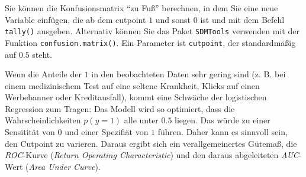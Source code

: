 \documentclass[12pt,]{book}
\newenvironment{Shaded}{\begin{snugshade}}{\end{snugshade}}
\newcommand{\KeywordTok}[1]{\textcolor[rgb]{0.13,0.29,0.53}{\textbf{{#1}}}}
\newcommand{\DataTypeTok}[1]{\textcolor[rgb]{0.13,0.29,0.53}{{#1}}}
\newcommand{\DecValTok}[1]{\textcolor[rgb]{0.00,0.00,0.81}{{#1}}}
\newcommand{\FloatTok}[1]{\textcolor[rgb]{0.00,0.00,0.81}{{#1}}}
\newcommand{\StringTok}[1]{\textcolor[rgb]{0.31,0.60,0.02}{{#1}}}
\newcommand{\CommentTok}[1]{\textcolor[rgb]{0.56,0.35,0.01}{\textit{{#1}}}}
\newcommand{\NormalTok}[1]{{#1}}
\begin{document}
Sie können die Konfusionsmatrix ``zu Fuß'' berechnen, in dem Sie eine
neue Variable einfügen, die ab dem cutpoint \(1\) und sonst \(0\) ist
und mit dem Befehl \texttt{tally()} ausgeben. Alternativ können Sie das
Paket \texttt{SDMTools} verwenden mit der Funktion
\texttt{confusion.matrix()}. Ein Parameter ist \texttt{cutpoint}, der
standardmäßig auf \(0.5\) steht.

\begin{Shaded}
\end{Shaded}

Wenn die Anteile der \(1\) in den beobachteten Daten sehr gering sind
(z. B. bei einem medizinischem Test auf eine seltene Krankheit, Klicks
auf einen Werbebanner oder Kreditausfall), kommt eine Schwäche der
logistischen Regression zum Tragen: Das Modell wird so optimiert, dass
die Wahrscheinlichkeiten \(p(y=1)\) alle unter \(0.5\) liegen. Das würde
zu einer Sensitität von \(0\) und einer Spezifiät von \(1\) führen.
Daher kann es sinnvoll sein, den Cutpoint zu varieren. Daraus ergibt
sich ein verallgemeinertes Gütemaß, die \emph{ROC}-Kurve (\emph{Return
Operating Characteristic}) und den daraus abgeleiteten \emph{AUC}-Wert
(\emph{Area Under Curve}).
\end{document}
